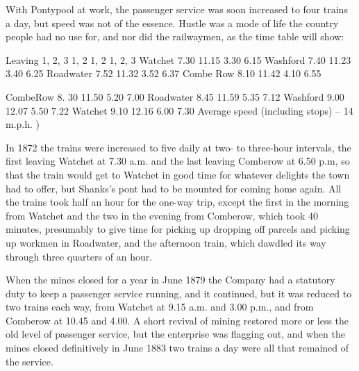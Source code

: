 \documentclass[11pt]{book}
\begin{document}
With Pontypool at work, the passenger service was soon increased to four trains a day, but speed was not of the essence. Hustle was a mode of life the country people had no use for, and nor did the railwaymen, as the time table will show:

Leaving	1, 2, 3	                1, 2	 1, 2	1, 2, 3
Watchet	  7.30		  11.15	  3.30	  6.15
Washford	  7.40		  11.23	  3.40	  6.25
Roadwater	  7.52		  11.32	   3.52	  6.37
Combe Row	  8.10                   11.42	   4.10	  6.55

CombeRow	  8. 30		  11.50	   5.20	  7.00
Roadwater	  8.45		  11.59	   5.35	  7.12
Washford	  9.00		  12.07	   5.50	   7.22
Watchet	  9.10		  12.16	   6.00	   7.30
 Average speed (including stops) – 14 m.p.h.                  )
 
In 1872 the trains were increased to five daily at two- to three-hour intervals, the first leaving Watchet at 7.30 a.m. and the last leaving Comberow at 6.50 p.m, so that the train would  get to Watchet in good time for whatever delights the town had to offer, but Shanks’s pont had to be mounted for coming home again. All the trains took half an hour for the one-way trip, except the first in the morning from Watchet and the two in the evening from Comberow, which took 40 minutes, presumably to give time for picking up dropping off parcels and picking up workmen in Roadwater, and the afternoon train, which dawdled its way through three quarters of an hour. 

When the mines closed for a year in June 1879 the Company had a statutory duty to keep a passenger service running, and it continued, but it was reduced to two trains each way, from Watchet at 9.15 a.m. and 3.00 p.m., and from Comberow at 10.45 and 4.00. A short revival of mining restored more or less the old level of passenger service, but the enterprise was flagging out, and when the mines closed definitively in June 1883 two trains a day were all that remained of the service.
\end{document}
